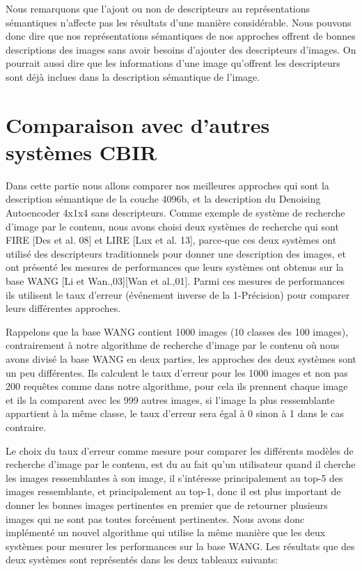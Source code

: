 	Nous remarquons que l'ajout ou non de descripteurs au représentations sémantiques n'affecte pas les résultats d'une manière considérable. Nous pouvons donc dire que nos représentations sémantiques de nos approches offrent de bonnes descriptions des images sans avoir besoins d'ajouter des descripteurs d'images.
On pourrait aussi dire que les informations d'une image qu'offrent les descripteurs sont déjà inclues dans la description sémantique de l'image.

\section{Comparaison avec d'autres systèmes CBIR}

	Dans cette partie nous allons comparer nos meilleures approches qui sont la description sémantique de la couche 4096b, et la description du Denoising Autoencoder 4x1x4 sans descripteurs. Comme exemple de système de recherche d'image par le contenu, nous avons choisi deux systèmes de recherche qui sont FIRE [Des et al. 08] et LIRE [Lux et al. 13], parce-que ces deux systèmes ont utilisé des descripteurs traditionnels pour donner une description des images, et ont présenté les mesures de performances que leurs systèmes ont obtenus sur la base WANG [Li et Wan.,03][Wan et al.,01]. Parmi ces mesures de performances ils utilisent le taux d'erreur (événement inverse de la 1-Précision) pour comparer leurs différentes approches.
	
	Rappelons que la base WANG contient 1000 images (10 classes des 100 images), contrairement à notre algorithme de recherche d'image par le contenu où nous avons divisé la base WANG en deux parties, les approches des deux systèmes sont un peu différentes. Ils calculent le taux d'erreur pour les 1000 images et non pas 200 requêtes comme dans notre algorithme, pour cela ils prennent chaque image et ils la comparent avec les 999 autres images, si l'image la plus ressemblante appartient à la même classe, le taux d'erreur sera égal à 0 sinon à 1 dans le cas contraire.

	Le choix du taux d'erreur comme mesure pour comparer les différents modèles de recherche d'image par le contenu, est du au fait qu'un utilisateur quand il cherche les images ressemblantes à son image, il s'intéresse principalement au top-5 des images ressemblante, et principalement au top-1, donc il est plus important de donner les bonnes images pertinentes en premier que de retourner plusieurs images qui ne sont pas toutes forcément pertinentes.
	Nous avons donc implémenté un nouvel algorithme qui utilise la même manière que les deux systèmes pour mesurer les performances sur la base WANG. Les résultats que des deux systèmes sont représentés dans les deux tableaux suivants:
	
